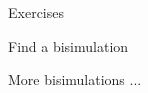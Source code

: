 \documentclass{beamer}
\begin{document}
\begin{slide}{Exercises}
\begin{exampleblock}{Find a bisimulation}
\end{exampleblock}
\end{slide}

\begin{slide}{More bisimulations}
  ...
\end{slide}


%
%  
%  
%  
%
%
%
%  
%
\end{document}
